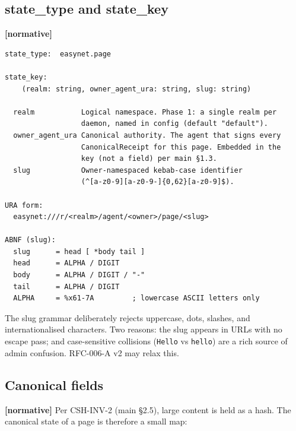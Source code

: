 \documentclass[11pt,a4paper]{article}
\newcommand{\normsv}{\textcolor{normativecolor}{\textbf{[normative]}}\xspace}
\theoremstyle{definition}
\begin{document}
\subsection{state\_type and state\_key}

\normsv{}

\begin{lstlisting}
state_type:  easynet.page

state_key:
    (realm: string, owner_agent_ura: string, slug: string)

  realm           Logical namespace. Phase 1: a single realm per
                  daemon, named in config (default "default").
  owner_agent_ura Canonical authority. The agent that signs every
                  CanonicalReceipt for this page. Embedded in the
                  key (not a field) per main §1.3.
  slug            Owner-namespaced kebab-case identifier
                  (^[a-z0-9][a-z0-9-]{0,62}[a-z0-9]$).

URA form:
  easynet:///r/<realm>/agent/<owner>/page/<slug>

ABNF (slug):
  slug      = head [ *body tail ]
  head      = ALPHA / DIGIT
  body      = ALPHA / DIGIT / "-"
  tail      = ALPHA / DIGIT
  ALPHA     = %x61-7A         ; lowercase ASCII letters only
\end{lstlisting}

The slug grammar deliberately rejects uppercase, dots, slashes, and
internationalised characters. Two reasons: the slug appears in URLs
with no escape pass; and case-sensitive collisions
(\texttt{Hello} vs \texttt{hello}) are a rich source of admin
confusion. RFC-006-A v2 may relax this.

\subsection{Canonical fields}

\normsv{} Per CSH-INV-2 (main \S2.5), large content is held as a
hash. The canonical state of a page is therefore a small map:
\end{document}
